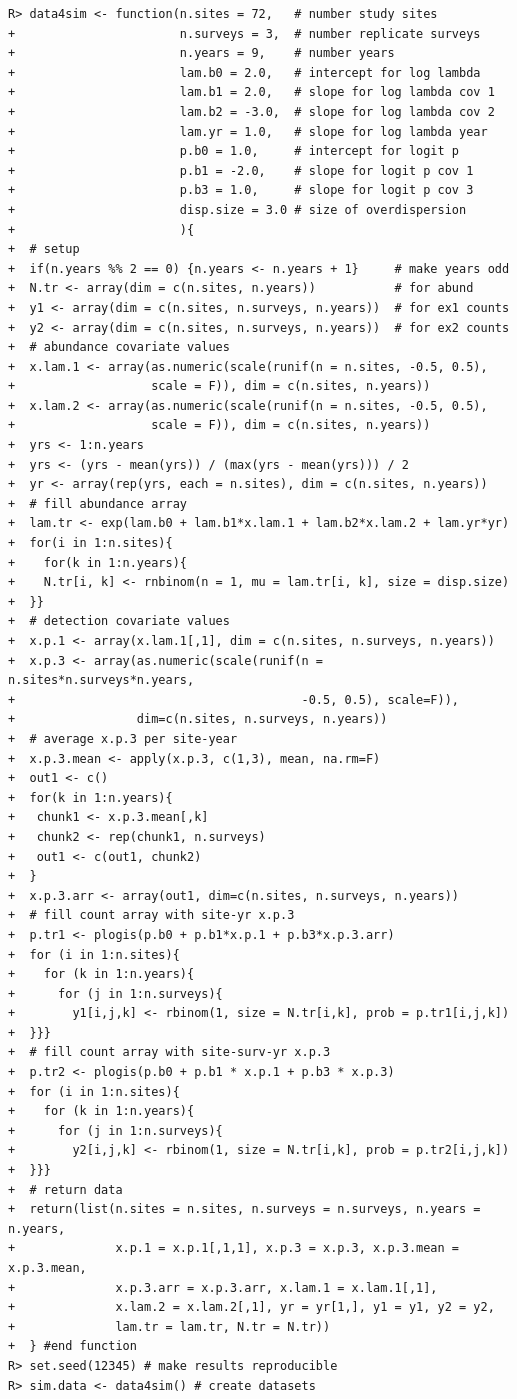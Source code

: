 \documentclass{article}
\begin{document}
\begin{verbatim}
R> data4sim <- function(n.sites = 72,   # number study sites
+                       n.surveys = 3,  # number replicate surveys
+                       n.years = 9,    # number years
+                       lam.b0 = 2.0,   # intercept for log lambda
+                       lam.b1 = 2.0,   # slope for log lambda cov 1
+                       lam.b2 = -3.0,  # slope for log lambda cov 2
+                       lam.yr = 1.0,   # slope for log lambda year
+                       p.b0 = 1.0,     # intercept for logit p
+                       p.b1 = -2.0,    # slope for logit p cov 1
+                       p.b3 = 1.0,     # slope for logit p cov 3
+                       disp.size = 3.0 # size of overdispersion
+                       ){
+  # setup
+  if(n.years %% 2 == 0) {n.years <- n.years + 1}     # make years odd
+  N.tr <- array(dim = c(n.sites, n.years))           # for abund
+  y1 <- array(dim = c(n.sites, n.surveys, n.years))  # for ex1 counts
+  y2 <- array(dim = c(n.sites, n.surveys, n.years))  # for ex2 counts
+  # abundance covariate values
+  x.lam.1 <- array(as.numeric(scale(runif(n = n.sites, -0.5, 0.5), 
+                   scale = F)), dim = c(n.sites, n.years))
+  x.lam.2 <- array(as.numeric(scale(runif(n = n.sites, -0.5, 0.5), 
+                   scale = F)), dim = c(n.sites, n.years))
+  yrs <- 1:n.years
+  yrs <- (yrs - mean(yrs)) / (max(yrs - mean(yrs))) / 2
+  yr <- array(rep(yrs, each = n.sites), dim = c(n.sites, n.years))
+  # fill abundance array
+  lam.tr <- exp(lam.b0 + lam.b1*x.lam.1 + lam.b2*x.lam.2 + lam.yr*yr)
+  for(i in 1:n.sites){
+    for(k in 1:n.years){
+    N.tr[i, k] <- rnbinom(n = 1, mu = lam.tr[i, k], size = disp.size)
+  }}
+  # detection covariate values
+  x.p.1 <- array(x.lam.1[,1], dim = c(n.sites, n.surveys, n.years))
+  x.p.3 <- array(as.numeric(scale(runif(n = n.sites*n.surveys*n.years, 
+                                        -0.5, 0.5), scale=F)), 
+                 dim=c(n.sites, n.surveys, n.years))
+  # average x.p.3 per site-year
+  x.p.3.mean <- apply(x.p.3, c(1,3), mean, na.rm=F)
+  out1 <- c()
+  for(k in 1:n.years){
+   chunk1 <- x.p.3.mean[,k]
+   chunk2 <- rep(chunk1, n.surveys)
+   out1 <- c(out1, chunk2)
+  }
+  x.p.3.arr <- array(out1, dim=c(n.sites, n.surveys, n.years))
+  # fill count array with site-yr x.p.3
+  p.tr1 <- plogis(p.b0 + p.b1*x.p.1 + p.b3*x.p.3.arr)
+  for (i in 1:n.sites){
+    for (k in 1:n.years){
+      for (j in 1:n.surveys){
+        y1[i,j,k] <- rbinom(1, size = N.tr[i,k], prob = p.tr1[i,j,k])
+  }}}
+  # fill count array with site-surv-yr x.p.3
+  p.tr2 <- plogis(p.b0 + p.b1 * x.p.1 + p.b3 * x.p.3)
+  for (i in 1:n.sites){
+    for (k in 1:n.years){
+      for (j in 1:n.surveys){
+        y2[i,j,k] <- rbinom(1, size = N.tr[i,k], prob = p.tr2[i,j,k])
+  }}}
+  # return data
+  return(list(n.sites = n.sites, n.surveys = n.surveys, n.years = n.years,
+              x.p.1 = x.p.1[,1,1], x.p.3 = x.p.3, x.p.3.mean = x.p.3.mean,
+              x.p.3.arr = x.p.3.arr, x.lam.1 = x.lam.1[,1],
+              x.lam.2 = x.lam.2[,1], yr = yr[1,], y1 = y1, y2 = y2,
+              lam.tr = lam.tr, N.tr = N.tr))
+  } #end function
R> set.seed(12345) # make results reproducible
R> sim.data <- data4sim() # create datasets
\end{verbatim}
\end{document}
